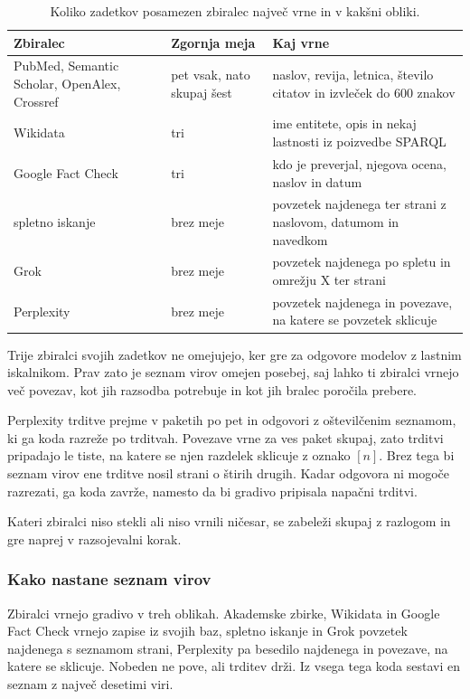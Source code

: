 \documentclass[a4paper, 12pt]{book}
\begin{document}
\begin{table}[H]
\centering
\small
{}
\begin{tabular}{@{}p{}p{}p{}@{}}
\toprule
Zbiralec & Zgornja meja & Kaj vrne \\
\midrule
PubMed, Semantic Scholar, OpenAlex, Crossref & pet vsak, nato skupaj šest &
naslov, revija, letnica, število citatov in izvleček do 600 znakov \\
\midrule
Wikidata & tri & ime entitete, opis in nekaj lastnosti iz poizvedbe SPARQL \\
\midrule
Google Fact Check & tri & kdo je preverjal, njegova ocena, naslov in datum \\
\midrule
spletno iskanje & brez meje & povzetek najdenega ter strani z naslovom, datumom
in navedkom \\
\midrule
Grok & brez meje & povzetek najdenega po spletu in omrežju X ter strani \\
\midrule
Perplexity & brez meje & povzetek najdenega in povezave, na katere se povzetek
sklicuje \\
\bottomrule
\end{tabular}
\caption{Koliko zadetkov posamezen zbiralec največ vrne in v kakšni obliki.}
\label{tbl:zadetki}
\end{table}

Trije zbiralci svojih zadetkov ne omejujejo, ker gre za odgovore modelov z
lastnim iskalnikom. Prav zato je seznam virov omejen posebej, saj lahko ti
zbiralci vrnejo več povezav, kot jih razsodba potrebuje in kot jih bralec
poročila prebere.

Perplexity trditve prejme v paketih po pet in odgovori z oštevilčenim seznamom,
ki ga koda razreže po trditvah. Povezave vrne za ves paket skupaj, zato trditvi
pripadajo le tiste, na katere se njen razdelek sklicuje z oznako $[n]$. Brez tega
bi seznam virov ene trditve nosil strani o štirih drugih. Kadar odgovora ni
mogoče razrezati, ga koda zavrže, namesto da bi gradivo pripisala napačni
trditvi.

Kateri zbiralci niso stekli ali niso vrnili ničesar, se zabeleži skupaj z
razlogom in gre naprej v razsojevalni korak. 

\subsubsection{Kako nastane seznam virov}
\label{ssec:viri}

Zbiralci vrnejo gradivo v treh oblikah. Akademske zbirke, Wikidata in Google
Fact Check vrnejo zapise iz svojih baz, spletno iskanje in Grok povzetek
najdenega s seznamom strani, Perplexity pa besedilo najdenega in povezave, na
katere se sklicuje. Nobeden ne pove, ali trditev drži. Iz vsega tega koda
sestavi en seznam z največ desetimi viri.
\end{document}
